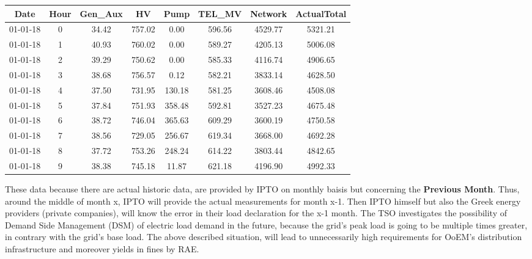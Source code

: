 \begin{table}[ht!]
\centering
\begin{tabular}{|c|c|c|c|c|c|c|c|}
\hline
\textbf{Date} & \textbf{Hour} & \textbf{Gen\_Aux} & \textbf{HV} & \textbf{Pump} & \textbf{TEL\_MV} & \textbf{Network} & \textbf{ActualTotal} \\ \hline
01-01-18      & 0             & 34.42             & 757.02      & 0.00          & 596.56           & 4529.77          & 5321.21              \\ \hline
01-01-18      & 1             & 40.93             & 760.02      & 0.00          & 589.27           & 4205.13          & 5006.08              \\ \hline
01-01-18      & 2             & 39.29             & 750.62      & 0.00          & 585.33           & 4116.74          & 4906.65              \\ \hline
01-01-18      & 3             & 38.68             & 756.57      & 0.12          & 582.21           & 3833.14          & 4628.50              \\ \hline
01-01-18      & 4             & 37.50             & 731.95      & 130.18        & 581.25           & 3608.46          & 4508.08              \\ \hline
01-01-18      & 5             & 37.84             & 751.93      & 358.48        & 592.81           & 3527.23          & 4675.48              \\ \hline
01-01-18      & 6             & 38.72             & 746.04      & 365.63        & 609.29           & 3600.19          & 4750.58              \\ \hline
01-01-18      & 7             & 38.56             & 729.05      & 256.67        & 619.34           & 3668.00          & 4692.28              \\ \hline
01-01-18      & 8             & 37.72             & 753.26      & 248.24        & 614.22           & 3803.44          & 4842.65              \\ \hline
01-01-18      & 9             & 38.38             & 745.18      & 11.87         & 621.18           & 4196.90          & 4992.33              \\ \hline
\end{tabular}
\end{table}
These data because there are actual historic data, are provided by IPTO on monthly baisis but concerning the \textbf{Previous Month}. Thus, around the middle of month x, IPTO will provide the actual measurements for month x-1. Then IPTO himself but also the Greek energy providers (private companies), will know the error in their load declaration for the x-1 month. The TSO investigates the possibility of Demand Side Management (DSM) of electric load demand in the future, because the grid's peak load is going to be multiple times greater, in contrary with the grid's base load. The above described situation, will lead to unnecessarily high requirements for OoEM's distribution infrastructure and moreover yields in fines by RAE.
